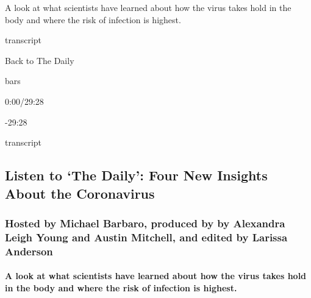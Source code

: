 A look at what scientists have learned about how the virus takes hold in
the body and where the risk of infection is highest.

transcript

Back to The Daily

bars

0:00/29:28

-29:28

transcript

\hypertarget{listen-to-the-daily-four-new-insights-about-the-coronavirus-1}{%
\subsection{Listen to `The Daily': Four New Insights About the
Coronavirus}\label{listen-to-the-daily-four-new-insights-about-the-coronavirus-1}}

\hypertarget{hosted-by-michael-barbaro-produced-by-by-alexandra-leigh-young-and-austin-mitchell-and-edited-by-larissa-anderson}{%
\subsubsection{Hosted by Michael Barbaro, produced by by Alexandra Leigh
Young and Austin Mitchell, and edited by Larissa
Anderson}\label{hosted-by-michael-barbaro-produced-by-by-alexandra-leigh-young-and-austin-mitchell-and-edited-by-larissa-anderson}}

\hypertarget{a-look-at-what-scientists-have-learned-about-how-the-virus-takes-hold-in-the-body-and-where-the-risk-of-infection-is-highest}{%
\paragraph{A look at what scientists have learned about how the virus
takes hold in the body and where the risk of infection is
highest.}\label{a-look-at-what-scientists-have-learned-about-how-the-virus-takes-hold-in-the-body-and-where-the-risk-of-infection-is-highest}}

